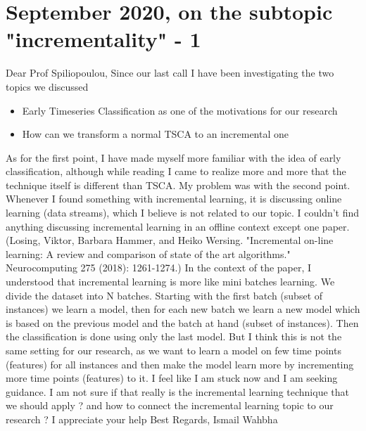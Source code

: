 \documentclass{article}
\begin{document}
\section*{\texorpdfstring{}. September 2020, on the subtopic "incrementality" - 1}
Dear Prof Spiliopoulou,\newline
Since our last call I have been investigating the two topics we discussed
\begin{itemize}
	\item Early Timeseries Classification as one of the motivations for our research
	\item How can we transform a normal TSCA to an incremental one
\end{itemize}
As for the first point, I have made myself more familiar with the idea of early classification, although while reading I came to realize more and more that the technique itself is different than TSCA.\newline
My problem was with the second point. Whenever I found something with incremental learning, it is discussing online learning (data streams), which I believe is not related to our topic.\newline
I couldn't find anything discussing incremental learning in an offline context except one paper. (Losing, Viktor, Barbara Hammer, and Heiko Wersing. "Incremental on-line learning: A review and comparison of state of the art algorithms." Neurocomputing 275 (2018): 1261-1274.)\newline
In the context of the paper, I understood that incremental learning is more like mini batches learning. We divide the dataset into N batches. Starting with the first batch (subset of instances) we learn a model, then for each new batch we learn a new model which is based on the previous model and the batch at hand (subset of instances). Then the classification is done using only the last model.\newline
But I think this is not the same setting for our research, as we want to learn a model on few time points (features) for all instances and then make the model learn more by incrementing more time points (features) to it.\newline
I feel like I am stuck now and I am seeking guidance.\newline
I am not sure if that really is the incremental learning technique that we should apply ?\newline
and how to connect the incremental learning topic to our research ?\newline
I appreciate your help\newline
Best Regards,\newline
Ismail Wahbha\newline
\end{document}
